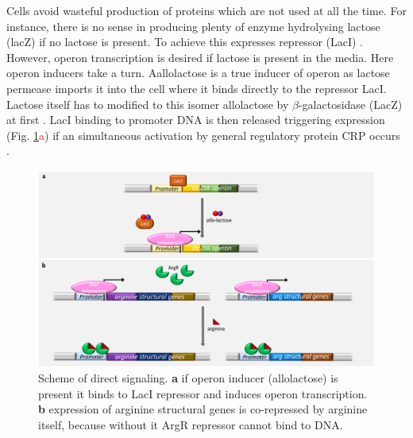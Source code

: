 Cells avoid wasteful production of proteins which are not used at all the time.
For instance, there is no sense in producing plenty of enzyme hydrolysing lactose (lacZ) if no lactose is present.
To achieve this  expresses  repressor (LacI) \cite{hudson1990co}.
However,  operon transcription is desired if lactose is present in the media.
Here  operon inducers take a turn.
Aallolactose is a true inducer of  operon as lactose permease imports it into the cell where it binds directly to the repressor LacI.
Lactose itself has to modified to this isomer allolactose by $\beta$-galactosidase (LacZ) at first \cite{jobe1972lac, wheatley2013structural}.
LacI binding to promoter DNA is then released triggering  expression (Fig. \ref{dir}\textcolor{red}{a}) if an simultaneous activation by general regulatory protein CRP occurs \cite{hudson1990co, clark2005molecular}.

\begin{figure}[ht]
  \centering
  \includegraphics[scale=0.27]{text/Pictures/DirectSignaling.png}
	\caption{Scheme of direct signaling. \textbf{a} if  operon inducer (allolactose) is present it binds to LacI repressor and induces  operon transcription. \textbf{b} expression of arginine structural genes is co-repressed by arginine itself, because without it ArgR repressor cannot bind to DNA.}
	\label{dir}
\end{figure}


